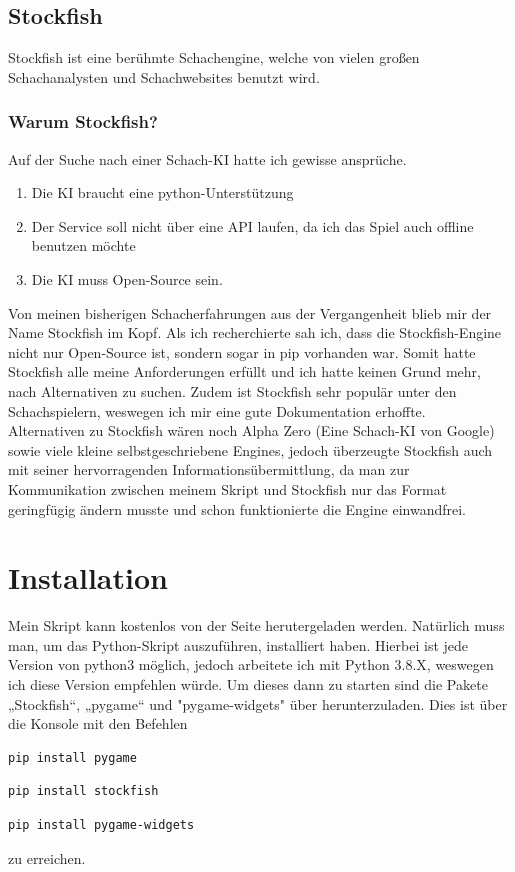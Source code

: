 \documentclass[a4paper, 10pt]{scrartcl}
\begin{document}
\subsection{Stockfish}
Stockfish ist eine berühmte Schachengine, welche von vielen großen Schachanalysten und Schachwebsites benutzt wird.

\subsubsection{Warum Stockfish?}
Auf der Suche nach einer Schach-KI hatte ich gewisse ansprüche.
\begin{enumerate}
        \item Die KI braucht eine python-Unterstützung
        \item Der Service soll nicht über eine API laufen, da ich das Spiel auch
        offline benutzen möchte
        \item Die KI muss Open-Source sein.
\end{enumerate}
Von meinen bisherigen Schacherfahrungen aus der Vergangenheit blieb mir
der Name Stockfish im Kopf. Als ich recherchierte sah ich, dass die 
Stockfish-Engine nicht nur Open-Source ist, sondern sogar in pip vorhanden war.
Somit hatte Stockfish alle meine Anforderungen erfüllt und ich hatte keinen Grund mehr,
nach Alternativen zu suchen.
Zudem ist Stockfish sehr populär unter den Schachspielern, weswegen ich mir eine
gute Dokumentation erhoffte.\\
Alternativen zu Stockfish wären noch Alpha Zero (Eine Schach-KI von Google)
sowie viele kleine selbstgeschriebene Engines, jedoch überzeugte Stockfish auch mit
seiner hervorragenden Informationsübermittlung, da man zur Kommunikation zwischen
meinem Skript und Stockfish nur das Format geringfügig ändern musste und schon funktionierte
die Engine einwandfrei.  


\section{Installation}
Mein Skript kann kostenlos von der Seite \href{https://github.com/Aetherion-dot/Chess_Python}{\color{blue}{github}} herutergeladen werden.
Natürlich muss man, um das Python-Skript auszuführen, \href{https://www.python.org/downloads/}{\color{blue}{python3}} installiert haben.
Hierbei ist jede Version von python3 möglich, jedoch arbeitete ich mit Python 3.8.X, weswegen ich diese Version empfehlen würde.
Um dieses dann zu starten sind die Pakete „Stockfish“, „pygame“ und "pygame-widgets" über \href{https://pypi.org/project/pip/}{\color{blue}{pip}} herunterzuladen.
Dies ist über die Konsole mit den Befehlen
\begin{lstlisting}[language=bash]
        pip install pygame
\end{lstlisting}
\begin{lstlisting}[language=bash]
        pip install stockfish
\end{lstlisting}
\begin{lstlisting}[language=bash]
        pip install pygame-widgets
\end{lstlisting}
zu erreichen.
\pagebreak
\end{document}
